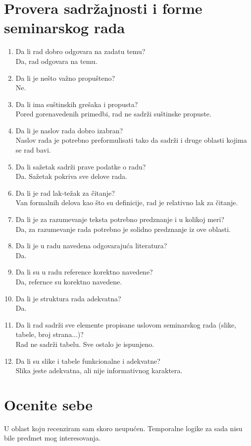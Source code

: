 \documentclass[a4paper]{report}
\begin{document}
\section{Provera sadržajnosti i forme seminarskog rada}

\begin{enumerate}
\item Da li rad dobro odgovara na zadatu temu?\\ Da, rad odgovara na temu. 
\item Da li je nešto važno propušteno?\\ Ne. 
\item Da li ima suštinskih grešaka i propusta?\\ Pored gorenavedenih primedbi, rad ne sadrži suštinske propuste.
\item Da li je naslov rada dobro izabran?\\ Naslov rada je potrebno preformulisati tako da sadrži i druge oblasti kojima se rad bavi.
\item Da li sažetak sadrži prave podatke o radu?\\ Da. Sažetak pokriva sve delove rada.
\item Da li je rad lak-težak za čitanje?\\ Van formalnih delova kao što su definicije, rad je relativno lak za čitanje. 
\item Da li je za razumevanje teksta potrebno predznanje i u kolikoj meri?\\ Da, za razumevanje rada potrebno je solidno predznanje iz ove oblasti.
\item Da li je u radu navedena odgovarajuća literatura?\\ Da. 
\item Da li su u radu reference korektno navedene?\\ Da, refernce su korektno navedene.
\item Da li je struktura rada adekvatna?\\ Da. 
\item Da li rad sadrži sve elemente propisane uslovom seminarskog rada (slike, tabele, broj strana...)?\\ Rad ne sadrži tabelu. Sve ostalo je ispunjeno.
\item Da li su slike i tabele funkcionalne i adekvatne?\\ Slika jeste adekvatna, ali nije informativnog karaktera. 
\end{enumerate}

\section{Ocenite sebe}
U oblast koju recenziram sam skoro neupućen. Temporalne logike za sada nisu bile predmet mog interesovanja.
\end{document}
